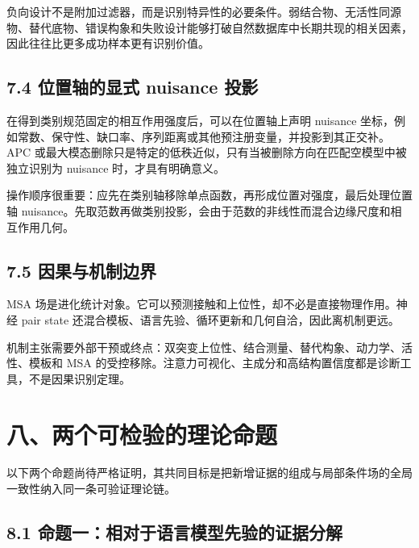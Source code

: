 \documentclass[10pt]{article}
\begin{document}
负向设计不是附加过滤器，而是识别特异性的必要条件。弱结合物、无活性同源物、替代底物、错误构象和失败设计能够打破自然数据库中长期共现的相关因素，因此往往比更多成功样本更有识别价值。\par

\subsection*{7.4 位置轴的显式 nuisance 投影}


在得到类别规范固定的相互作用强度后，可以在位置轴上声明 nuisance 坐标，例如常数、保守性、缺口率、序列距离或其他预注册变量，并投影到其正交补。APC 或最大模态删除只是特定的低秩近似，只有当被删除方向在匹配空模型中被独立识别为 nuisance 时，才具有明确意义。\par

操作顺序很重要：应先在类别轴移除单点函数，再形成位置对强度，最后处理位置轴 nuisance。先取范数再做类别投影，会由于范数的非线性而混合边缘尺度和相互作用几何。\par

\subsection*{7.5 因果与机制边界}


MSA 场是进化统计对象。它可以预测接触和上位性，却不必是直接物理作用。神经 pair state 还混合模板、语言先验、循环更新和几何自洽，因此离机制更远。\par

机制主张需要外部干预或终点：双突变上位性、结合测量、替代构象、动力学、活性、模板和 MSA 的受控移除。注意力可视化、主成分和高结构置信度都是诊断工具，不是因果识别定理。\par

\section*{八、两个可检验的理论命题}


以下两个命题尚待严格证明，其共同目标是把新增证据的组成与局部条件场的全局一致性纳入同一条可验证理论链。\par

\subsection*{8.1 命题一：相对于语言模型先验的证据分解}
\end{document}
